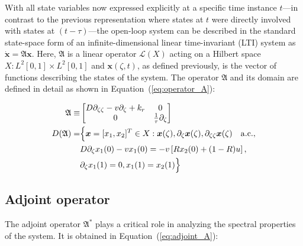 With all state variables now expressed explicitly at a specific time instance $t$—in contrast to the previous representation where states at $t$ were directly involved with states at $(t-\tau)$—the open-loop system can be described in the standard state-space form of an infinite-dimensional linear time-invariant (LTI) system as $\dot{\bm{x}} = \mathfrak{A} \bm{x}$. Here, $\mathfrak{A}$ is a linear operator $\mathcal{L}(X)$ acting on a Hilbert space $X: L^2[0,1] \times L^2[0,1]$ and $\bm{x}(\zeta,t)$, as defined previously, is the vector of functions describing the states of the system. The operator $\mathfrak{A}$ and its domain are defined in detail as shown in Equation~(\ref{eq:operator_A}):

\begin{equation} \label{eq:operator_A}
    \begin{aligned}
        \mathfrak{A} \equiv&
        \begin{bmatrix}
            D \partial_{\zeta \zeta} - v \partial_\zeta + k_r & 0 \\
            0 & \frac{1}{\tau} \partial_\zeta
        \end{bmatrix}\\
        D(\mathfrak{A}) =& \Bigl\{ \bm{x} = [x_1, x_2]^T \in X:
        \bm{x}(\zeta), \partial_\zeta \bm{x}(\zeta), \partial_{\zeta \zeta} \bm{x}(\zeta) \quad \mathrm{a.c.},\\
        &D \partial_\zeta x_1(0) - v x_1(0) = -v \left[ R x_2(0) + (1-R) u \right],\\
        &\partial_\zeta x_1(1) = 0,
        x_1(1) = x_2(1) \Bigr\}
    \end{aligned}
\end{equation}

\subsection{Adjoint operator}

The adjoint operator $\mathfrak{A}^*$ plays a critical role in analyzing the spectral properties of the system. It is obtained in Equation~(\ref{eq:adjoint_A}):

